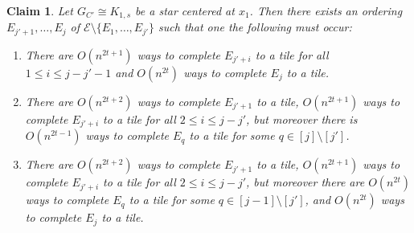 \documentclass{article}
\newtheorem{claim}[theorem]{Claim}
\theoremstyle{definition}
\begin{document}
\begin{claim}\label{lemma: fixed star}
Let $G_{C'} \cong K_{1,s}$ be a star centered at $x_1$. Then there exists an ordering $E_{j'+1},\dots,E_{j}$ of $\mathcal{E}\setminus \{E_{1},\dots, E_{j'}\}$ such that one the following must occur:
\begin{enumerate}
    \item[(1)] There are $O(n^{2t+1})$ ways to complete $E_{j'+i}$ to a tile for all $1\leq i \leq j-j'-1$ and $O(n^{2t})$ ways to complete $E_{j}$ to a tile.
    \item[(2)] There are $O(n^{2t+2})$ ways to complete $E_{j'+1}$ to a tile, $O(n^{2t+1})$ ways to complete $E_{j'+i}$ to a tile for all $2\leq i \leq j-j'$, but moreover there is $O(n^{2t-1})$ ways to complete $E_q$ to a tile for some $q\in [j]\setminus [j']$.
    \item[(3)] There are $O(n^{2t+2})$ ways to complete $E_{j'+1}$ to a tile, $O(n^{2t+1})$ ways to complete $E_{j'+i}$ to a tile for all $2\leq i \leq j-j'$, but moreover there are $O(n^{2t})$ ways to complete $E_q$ to a tile for some $q\in [j-1]\setminus [j']$, and $O(n^{2t})$ ways to complete $E_{j}$ to a tile.
\end{enumerate} 
\end{claim}
\end{document}
